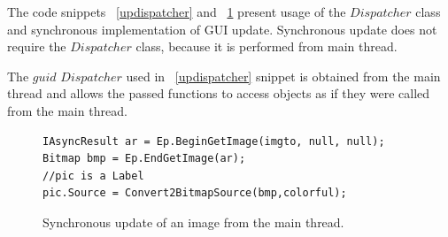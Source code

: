   The code snippets ~\ref{updispatcher} and ~\ref{upsynchronous} present usage of the $Dispatcher$ class and 
  synchronous implementation of GUI update. Synchronous update does not require the $Dispatcher$ class,
  because it is performed from main thread.

  The $guid$ $Dispatcher$ used in ~\ref{updispatcher} snippet is obtained from the main thread and
  allows the passed functions to access objects as if they were called from the main thread.

\begin{figure}[!hbp]
\begin{lstlisting}
IAsyncResult ar = Ep.BeginGetImage(imgto, null, null);
Bitmap bmp = Ep.EndGetImage(ar);
//pic is a Label
pic.Source = Convert2BitmapSource(bmp,colorful);
\end{lstlisting}
\caption{Synchronous update of an image from the main thread.}
\label{upsynchronous}
\end{figure}
